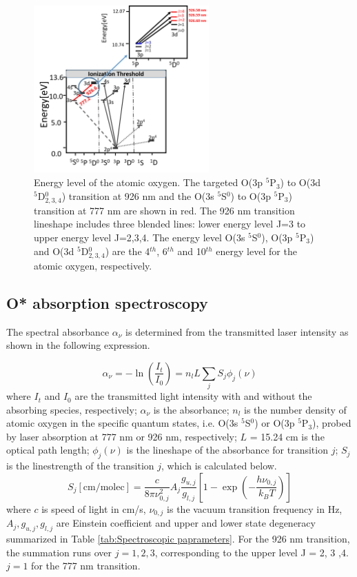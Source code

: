 \documentclass[12pt]{iopart}
\begin{document}
\begin{figure}[h]
  \centering
     \includegraphics[width=0.6\textwidth]{energy_level_new.png}
    \caption{\label{fig:energy_level}  Energy level of the atomic oxygen. The targeted O(3p $^5$P$_{3}$) to O(3d $^5$D$_{2,3,4}^0$) transition at 926 nm and the  O(3s $^5$S$^0$) to O(3p $^5$P$_{3}$) transition at 777 nm are shown in red. The 926 nm transition lineshape includes three blended lines: lower energy level J=3 to upper energy level J=2,3,4. 
    The energy level O(3s $^5$S$^0$), O(3p $^5$P$_{3}$) and O(3d $^5$D$_{2,3,4}^0$) are the 4$^{th}$, 6$^{th}$ and 10$^{th}$ energy level for the atomic oxygen, respectively. 
    }
\end{figure}

\subsection{O* absorption spectroscopy }
The spectral absorbance $\alpha_{\nu}$ is determined from the transmitted laser intensity as shown in the following expression.

\begin{equation}\label{eq:beer's_law}
    \alpha_{\nu} = - \ln (\frac{I_t}{I_0}) = n_l L\sum_j S_j \phi_j(\nu)
\end{equation}
where $I_t$ and $I_0$ are the transmitted light intensity with and without the absorbing species, respectively;  $\alpha_{\nu}$ is the absorbance; $n_l$ is the number density of atomic oxygen in the specific quantum states, i.e. O(3s $^5$S$^0$) or O(3p $^5$P$_{3}$), probed by laser absorption at 777 nm or 926 nm, respectively; $L$ = 15.24 cm is the optical path length; $\phi_j(\nu)$ is the lineshape of the absorbance for transition $j$; $S_j$ is the linestrength of the transition $j$, which is calculated below.
\begin{equation}
S_j [\textrm{cm/molec}] = \frac{c}{8\pi\nu_{0,j}^2}  A_{j} \frac{g_{u,j}}{g_{l,j}}[1-\exp(-\frac{h\nu_{0,j}}{k_BT})]  
\end{equation}
where $c$ is speed of light in cm/s, $\nu_{0,j}$ is the vacuum transition frequency in Hz, $A_{j},g_{u,j},g_{l,j}$ are Einstein coefficient and upper and lower state degeneracy summarized in Table \ref{tab:Spectroscopic paprameters}. For the 926 nm transition, the summation runs over $j=1,2,3$, corresponding to the upper level J = 2, 3 ,4. $j=1$ for the 777 nm transition.
\end{document}
